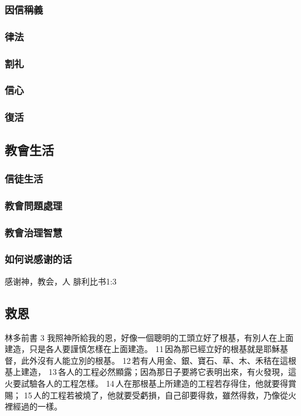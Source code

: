 \subsubsection{因信稱義}

\subsubsection{律法}

\subsubsection{割礼}

\subsubsection{信心}

\subsubsection{復活}

\subsection{教會生活}
\subsubsection{信徒生活}

\subsubsection{教會問題處理}

\subsubsection{教會治理智慧}

\subsubsection{如何说感谢的话}
感谢神，教会，人
腓利比书1:3

\subsection{救恩}
林多前書 3
我照神所給我的恩，好像一個聰明的工頭立好了根基，有別人在上面建造，只是各人要謹慎怎樣在上面建造。 11 因為那已經立好的根基就是耶穌基督，此外沒有人能立別的根基。 12 若有人用金、銀、寶石、草、木、禾秸在這根基上建造， 13 各人的工程必然顯露；因為那日子要將它表明出來，有火發現，這火要試驗各人的工程怎樣。 14 人在那根基上所建造的工程若存得住，他就要得賞賜； 15 人的工程若被燒了，他就要受虧損，自己卻要得救，雖然得救，乃像從火裡經過的一樣。


